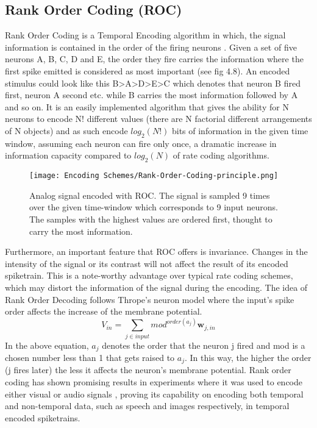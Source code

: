 \documentclass[12pt]{report}
\begin{document}
\subsection{Rank Order Coding (ROC)}

Rank Order Coding is a Temporal Encoding algorithm in which, the signal information is contained in the order of the firing neurons \cite{Thorpe1998}. Given a set of five neurons A, B, C, D and E, the order they fire carries the information where the first spike emitted is considered as most important (see fig 4.8). An encoded stimulus could look like this B>A>D>E>C which denotes that neuron B fired first, neuron A second etc. while B carries the most information followed by A and so on. It is an easily implemented algorithm that gives the ability for N neurons to encode N! different values (there are N factorial different arrangements of N objects) and as such encode \(log_2(N!)\) bits of information in the given time window, assuming each neuron can fire only once, a dramatic increase in information capacity compared to \(log_2(N)\) of rate coding algorithms. 

\begin{figure}[htp]
    \centering
    \texttt{[image: Encoding Schemes/Rank-Order-Coding-principle.png]}
    \caption{Analog signal encoded with ROC. The signal is sampled 9 times over the given time-window which corresponds to 9 input neurons. The samples with the highest values are ordered first, thought to carry the most information.}
    \label{fig:spikeprop-net-architecture}
\end{figure}

Furthermore, an important feature that ROC offers is invariance. Changes in the intensity of the signal or its contrast will not affect the result of its encoded spiketrain. This is a note-worthy advantage over typical rate coding schemes, which may distort the information of the signal during the encoding. The idea of Rank Order Decoding follows Thrope's neuron model where the input's spike order affects the increase of the membrane potential.
\[V_{in} = \sum_{j\in input}mod^{order(a_j)}\pmb{w}_{j,in}\]
In the above equation, \(a_j\) denotes the order that the neuron j fired and mod is a chosen number less than 1 that gets raised to \(a_j\). In this way, the higher the order (j fires later) the less it affects the neuron's membrane potential. Rank order coding has shown promising results in experiments where it was used to encode either visual \cite{Delorme2001} or audio signals \cite{Loiselle2006}, proving its capability on encoding both temporal and non-temporal data, such as speech and images respectively, in temporal encoded spiketrains.
\end{document}
